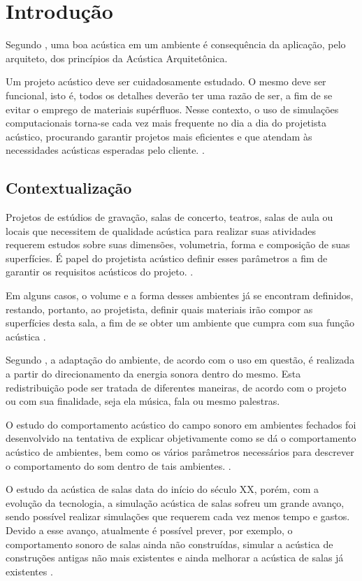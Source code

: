 \chapter[Introdução]{Introdução}

Segundo , uma boa acústica em um ambiente é consequência da aplicação, pelo arquiteto, dos princípios da Acústica Arquitetônica.

Um projeto acústico deve ser cuidadosamente estudado. O mesmo deve ser funcional, isto é, todos os detalhes deverão ter uma razão de ser, a fim de se evitar o emprego de materiais supérfluos. Nesse contexto, o uso de simulações computacionais torna-se cada vez mais frequente no dia a dia do projetista acústico, procurando garantir projetos mais eficientes e que atendam às necessidades acústicas esperadas pelo cliente. \cite{silva}.

\section{Contextualização}

Projetos de estúdios de gravação, salas de concerto, teatros, salas de aula ou locais que necessitem de qualidade acústica para realizar suas atividades requerem estudos sobre suas dimensões, volumetria, forma e composição de suas superfícies. É papel do projetista acústico definir esses parâmetros a fim de garantir os requisitos acústicos do projeto. \cite{ramires}.

Em alguns casos, o volume e a forma desses ambientes já se encontram definidos, restando, portanto, ao projetista, definir quais materiais irão compor as superfícies desta sala, a fim de se obter um ambiente que cumpra com sua função acústica \cite{ramires}.

Segundo , a adaptação do ambiente, de acordo com o uso em questão, é realizada a partir do direcionamento da energia sonora dentro do mesmo. Esta redistribuição pode ser tratada de diferentes maneiras, de acordo com o projeto ou com sua finalidade, seja ela música, fala ou mesmo palestras.

O estudo do comportamento acústico do campo sonoro em ambientes fechados foi desenvolvido na tentativa de explicar objetivamente como se dá o comportamento acústico de ambientes, bem como os vários parâmetros necessários para descrever o comportamento do som dentro de tais ambientes. \cite{torres}.

O estudo da acústica de salas data do início do século XX, porém, com a evolução da tecnologia, a simulação acústica de salas sofreu um grande avanço, sendo possível realizar simulações que requerem cada vez menos tempo e gastos. Devido a esse avanço, atualmente é possível prever, por exemplo, o comportamento sonoro de salas ainda não construídas, simular a acústica de construções antigas não mais existentes e ainda melhorar a acústica de salas já existentes \cite{torres}.

